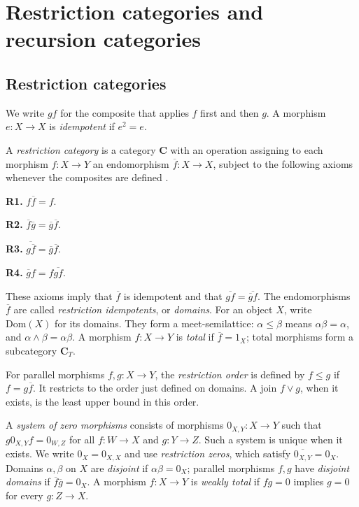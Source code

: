 \documentclass[letterpaper,10pt]{amsart}
\theoremstyle{plain}
\theoremstyle{definition}
\newcommand{\rst}[1]{\overline{#1}}
\begin{document}
\section{Restriction categories and recursion categories}\label{sec:preliminaries}

\subsection{Restriction categories}
We write $gf$ for the composite that applies $f$ first and then $g$.
A morphism $e:X\to X$ is \textit{idempotent} if $e^2=e$.

A \textit{restriction category} is a category $\mathbf C$ with an
operation assigning to each morphism $f:X\to Y$ an endomorphism
$\rst f:X\to X$, subject to the following axioms whenever the
composites are defined \cite{MR1871071,MR1963657}.

\noindent\textbf{R1.} $f\rst f=f$.

\noindent\textbf{R2.} $\rst f\rst g=\rst g\rst f$.

\noindent\textbf{R3.} $\rst{g\rst f}=\rst g\rst f$.

\noindent\textbf{R4.} $\rst g f=f\rst{gf}$.

These axioms imply that $\rst f$ is idempotent and that
$\rst{gf}=\rst{\rst g f}$. The endomorphisms $\rst f$ are called
\textit{restriction idempotents}, or \textit{domains}. For an object
$X$, write $\mathrm{Dom}(X)$ for its domains. They form a
meet-semilattice: $\alpha\le\beta$ means $\alpha\beta=\alpha$, and
$\alpha\wedge\beta=\alpha\beta$. A morphism $f:X\to Y$ is
\textit{total} if $\rst f=1_X$; total morphisms form a subcategory
$\mathbf C_T$.

For parallel morphisms $f,g:X\to Y$, the \textit{restriction order}
is defined by $f\le g$ if $f=g\rst f$. It restricts to the order
just defined on domains. A join $f\vee g$, when it exists, is the
least upper bound in this order.

A \textit{system of zero morphisms} consists of morphisms
$0_{X,Y}:X\to Y$ such that $g0_{X,Y}f=0_{W,Z}$ for all
$f:W\to X$ and $g:Y\to Z$. Such a system is unique when it exists.
We write $0_X=0_{X,X}$ and use \textit{restriction zeros}, which
satisfy $\rst{0_{X,Y}}=0_X$. Domains $\alpha,\beta$ on $X$ are
\textit{disjoint} if $\alpha\beta=0_X$; parallel morphisms $f,g$
have \textit{disjoint domains} if $\rst f\rst g=0_X$.
A morphism $f:X\to Y$ is \textit{weakly total} if $fg=0$ implies
$g=0$ for every $g:Z\to X$.
\end{document}
